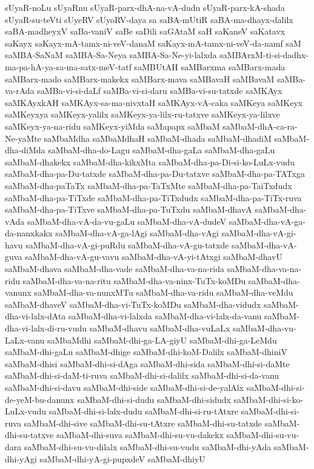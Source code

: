 {sUyaR-noLu
sUyaRnu
sUyaR-parx-dhA-na-vA-dudu
sUyaR-parx-kA-shada
sUyaR-su-teVti
sUyeRV
sUyoRV-daya
sa
saBA-mUtiR
saBA-ma-dhayx-dalilx
saBA-madheyxV
saBa-vaniV
saBe
saDili
saGAtaM
saH
saKaneV
saKatavx
saKayx
saKayx-mA-tamx-ni-veV-danaM
saKayx-mA-tamx-ni-veV-da-namf
saM
saMBA-SaNaM
saMBA-Sa-Neya
saMBA-Sa-Ne-yi-lalxda
saMBArxM-ti-si-dadhx-ma-pa-hA-ya-sa-ma-satx-meV-tatf
saMBUtAH
saMBarxma
saMBarx-mada
saMBarx-mado
saMBarx-makekx
saMBarx-mava
saMBavaH
saMBavaM
saMBa-va-rAda
saMBa-vi-si-daLf
saMBa-vi-si-daru
saMBa-vi-su-tatxde
saMKAyx
saMKAyxkAH
saMKAyx-sa-ma-nivxtaH
saMKAyx-vA-caka
saMKeya
saMKeyx
saMKeyxya
saMKeyx-yalilx
saMKeyx-ya-lilx-ru-tatxve
saMKeyx-ya-lilxve
saMKeyx-ya-na-ridu
saMKeyx-yiMda
saMapapx
saMbaM
saMbaM-dhA-ca-ra-Ne-yaMte
saMbaMdha
saMbaMdhaH
saMbaM-dhada
saMbaM-dhadiM
saMbaM-dha-diMda
saMbaM-dha-do-Lagu
saMbaM-dha-gaLa
saMbaM-dha-gaLu
saMbaM-dhakekx
saMbaM-dha-kikxMta
saMbaM-dha-pa-Di-si-ko-LuLx-vudu
saMbaM-dha-pa-Du-tatxde
saMbaM-dha-pa-Du-tatxve
saMbaM-dha-pa-TATxga
saMbaM-dha-paTaTx
saMbaM-dha-pa-TaTxMte
saMbaM-dha-pa-TaiTxdudx
saMbaM-dha-pa-TiTxde
saMbaM-dha-pa-TiTxdudx
saMbaM-dha-pa-TiTx-ruva
saMbaM-dha-pa-TiTxve
saMbaM-dha-pa-TuTxdu
saMbaM-dhavA
saMbaM-dha-vAda
saMbaM-dha-vA-da-vu-gaLu
saMbaM-dha-vA-dudeV
saMbaM-dha-vA-ga-da-nanxkakx
saMbaM-dha-vA-ga-lAgi
saMbaM-dha-vAgi
saMbaM-dha-vA-gi-havu
saMbaM-dha-vA-gi-puRdu
saMbaM-dha-vA-gu-tatxde
saMbaM-dha-vA-guva
saMbaM-dha-vA-gu-vavu
saMbaM-dha-vA-yi-tAtxgi
saMbaM-dhavU
saMbaM-dhava
saMbaM-dha-vade
saMbaM-dha-va-na-rida
saMbaM-dha-va-na-ridu
saMbaM-dha-va-na-ritu
saMbaM-dha-va-ninx-TuTx-koMDu
saMbaM-dha-vanunx
saMbaM-dha-va-nunxMTu
saMbaM-dha-va-ridu
saMbaM-dha-veMdu
saMbaM-dhaveV
saMbaM-dha-vi-TuTx-koMDu
saMbaM-dha-vidudx
saMbaM-dha-vi-lalx-dAta
saMbaM-dha-vi-lalxda
saMbaM-dha-vi-lalx-da-vanu
saMbaM-dha-vi-lalx-di-ru-vudu
saMbaM-dhavu
saMbaM-dha-vuLaLx
saMbaM-dha-vu-LaLx-vanu
saMbaMdhi
saMbaM-dhi-ga-LA-giyU
saMbaM-dhi-ga-LeMdu
saMbaM-dhi-gaLu
saMbaM-dhige
saMbaM-dhi-koM-Dalilx
saMbaM-dhiniV
saMbaM-dhisi
saMbaM-dhi-si-dAga
saMbaM-dhi-sida
saMbaM-dhi-si-daMte
saMbaM-dhi-si-daM-ti-ruva
saMbaM-dhi-si-dalilx
saMbaM-dhi-si-da-vanu
saMbaM-dhi-si-davu
saMbaM-dhi-side
saMbaM-dhi-si-de-yalAlx
saMbaM-dhi-si-de-yeM-bu-danunx
saMbaM-dhi-si-dudu
saMbaM-dhi-sidudx
saMbaM-dhi-si-ko-LuLx-vudu
saMbaM-dhi-si-lalx-dudu
saMbaM-dhi-si-ru-tAtxre
saMbaM-dhi-si-ruva
saMbaM-dhi-sive
saMbaM-dhi-su-tAtxre
saMbaM-dhi-su-tatxde
saMbaM-dhi-su-tatxve
saMbaM-dhi-suva
saMbaM-dhi-su-vu-dakekx
saMbaM-dhi-su-vu-dara
saMbaM-dhi-su-vu-dilalx
saMbaM-dhi-su-vudu
saMbaM-dhi-yAda
saMbaM-dhi-yAgi
saMbaM-dhi-yA-gi-pupxdeV
saMbaM-dhiyU
}
